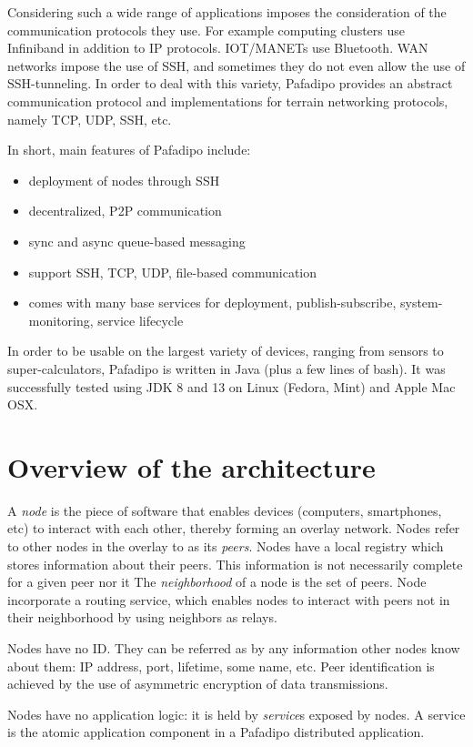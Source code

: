 \documentclass{article}
\begin{document}
Considering such a wide range of applications imposes the consideration of the communication protocols they use. For example computing clusters use Infiniband in addition to IP protocols. IOT/MANETs use Bluetooth. WAN networks impose the use of SSH, and sometimes they do not even allow the use of SSH-tunneling. In order to deal with this variety, Pafadipo provides an abstract communication protocol and implementations for terrain networking protocols, namely TCP, UDP, SSH, etc.

In short, main features of Pafadipo include:
\begin{itemize}
    \item deployment of nodes through SSH
    \item decentralized, P2P communication
    \item sync and async queue-based messaging
    \item support SSH, TCP, UDP, file-based communication
    \item comes with many base services for deployment, publish-subscribe, system-monitoring, service lifecycle
\end{itemize}


In order to be usable on the largest variety of devices, ranging from sensors to super-calculators, Pafadipo is written in Java (plus a few lines of bash). It was successfully tested using JDK 8 and 13 on Linux (Fedora, Mint) and Apple Mac OSX.


\section{Overview of the architecture}
A \textit{node} is the piece of software that enables devices (computers, smartphones, etc) to interact with each other, thereby forming an overlay network. Nodes refer to other nodes in the overlay to as its \textit{peers}.
Nodes have a local registry which stores information about their peers. This information is not necessarily complete for a given peer nor it  The \textit{neighborhood} of a node is the set of peers. Node incorporate a routing service, which enables nodes to interact with peers not in their neighborhood by 
using neighbors as relays.

Nodes have no ID. They can be referred  as by any information other nodes know about them: IP address, port, lifetime, some name, etc. Peer identification is achieved by the use of asymmetric encryption of data transmissions.

Nodes have no application logic: it is held by \textit{service}s exposed by nodes. A service is the atomic application component in a Pafadipo distributed application.
\end{document}
